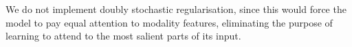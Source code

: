 \documentclass[11pt,a4paper]{article}
\begin{document}
We do not implement doubly stochastic regularisation, since this would force the model to pay equal attention to modality features, eliminating the purpose of learning to attend to the most salient parts of its input.



\end{document}
